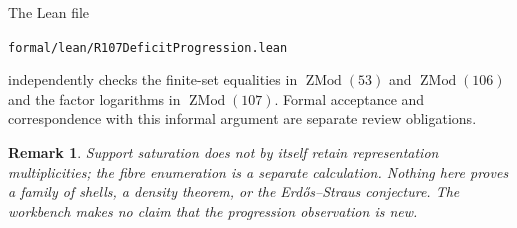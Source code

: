 \documentclass[11pt]{article}
\newtheorem{remark}[theorem]{Remark}
\begin{document}
The Lean file
\begin{center}
\texttt{formal/lean/R107DeficitProgression.lean}
\end{center}
independently checks the finite-set equalities in $\operatorname{ZMod}(53)$
and $\operatorname{ZMod}(106)$ and the factor logarithms in
$\operatorname{ZMod}(107)$.  Formal acceptance and correspondence with this
informal argument are separate review obligations.

\begin{remark}
Support saturation does not by itself retain representation multiplicities;
the fibre enumeration is a separate calculation.  Nothing here proves a
family of shells, a density theorem, or the Erd\H{o}s--Straus conjecture.
The workbench makes no claim that the progression observation is new.
\end{remark}
\end{document}
